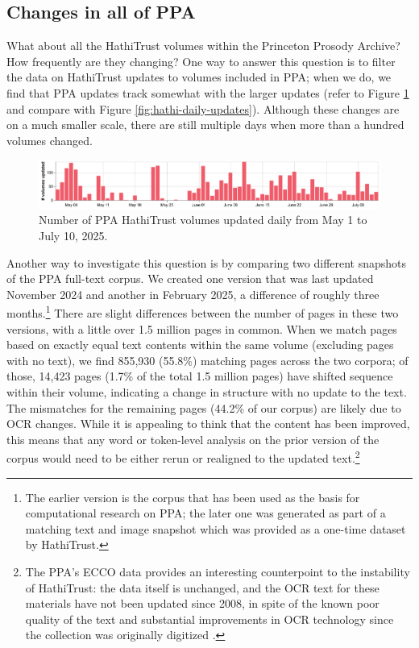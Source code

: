 \documentclass[final]{anthology-ch} %
\begin{document}
\subsection{Changes in all of PPA}

What about all the HathiTrust volumes within the Princeton Prosody Archive? How frequently are they changing? One way to answer this question is to filter the data on HathiTrust updates to volumes included in PPA; when we do, we find that PPA updates track somewhat with the larger updates (refer to Figure \ref{fig:ppa-daily-updates} and compare with Figure \ref{fig:hathi-daily-updates}). Although these changes are on a much smaller scale, there are still multiple days when more than a hundred volumes changed.

\begin{figure}[t!]
    \centering
    \includegraphics[width=1\linewidth]{images/ppa_hathitrust_changes_countonly.png}
    \caption{Number of PPA HathiTrust volumes updated daily from May 1 to July 10, 2025.}
    \label{fig:ppa-daily-updates}
\end{figure}

Another way to investigate this question is by comparing two different snapshots of the PPA full-text corpus. We created one version that was last updated November 2024 and another in February 2025, a difference of roughly three months.\footnote{The earlier version is the corpus that has been used as the basis for computational research on PPA; the later one was generated as part of a matching text and image snapshot which was provided as a one-time dataset by HathiTrust.} There are slight differences between the number of pages in these two versions, with a little over 1.5 million pages in common. When we match pages based on exactly equal text contents within the same volume (excluding pages with no text), we find 855,930 (55.8\%) matching pages across the two corpora; of those, 14,423 pages (1.7\% of the total 1.5 million pages) have shifted sequence within their volume, indicating a change in structure with no update to the text. The mismatches for the remaining pages (44.2\% of our corpus) are likely due to OCR changes. While it is appealing to think that the content has been improved, this means that any word or token-level analysis on the prior version of the corpus would need to be either rerun or realigned to the updated text.\footnote{The PPA's ECCO data provides an interesting counterpoint to the instability of HathiTrust: the data itself is unchanged, and the OCR text for these materials have not been updated since 2008, in spite of the known poor quality of the text and substantial improvements in OCR technology since the collection was originally digitized \cite{hill_quantifying_2019}.}
\end{document}
